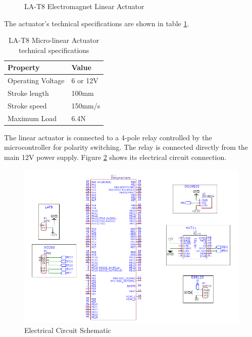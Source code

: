 \begin{itemize}
\begin{figure}[H]
\caption[LA-T8 Electromagnet Linear Actuator]{LA-T8 Electromagnet Linear Actuator\cite{la_t8}}
\label{fig: LA-T8 Electromagnet Linear Actuator}
\end{figure}
The actuator's technical specifications are shown in table \ref{tab:LA-T8 Micro-linear Actuator technical specifications}.
\begin{table}[H]
\centering
\caption[LA-T8 Micro-linear Actuator technical specifications]{LA-T8 Micro-linear Actuator technical specifications \cite{LA-T8 Electromagnet Linear Actuator}}
\begin{tabular}{|l|l|}
\hline
\textbf{Property} & \textbf{Value} \\ \hline
Operating Voltage & 6 or 12V \\ \hline
Stroke length & 100mm \\ \hline
Stroke speed & 150mm/s \\ \hline
Maximum Load & 6.4N \\ \hline
\end{tabular}
\label{tab:LA-T8 Micro-linear Actuator technical specifications}
\end{table}
The linear actuator is connected to a 4-pole relay controlled by the microcontroller for polarity switching. The relay is connected directly from the main 12V power supply. Figure \ref{fig: Electrical Circuit Schematic} shows its electrical circuit connection.
\end{itemize}

\begin{figure}[H]
\centering
\includegraphics [width=\textwidth]{Figures/Schematic_FYP18_2022-12-10.png}
\caption{Electrical Circuit Schematic}
\label{fig: Electrical Circuit Schematic}
\end{figure}


